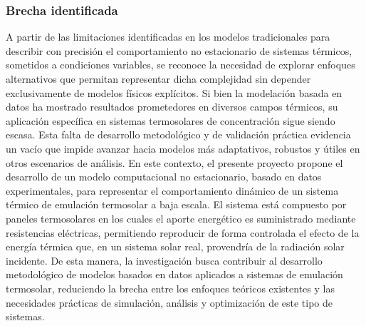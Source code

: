 \documentclass[11pt]{report}
\begin{document}
\subsubsection{Brecha identificada}

A partir de las limitaciones identificadas en los modelos tradicionales para describir con precisión el comportamiento no estacionario de sistemas térmicos, sometidos a condiciones variables, se reconoce la necesidad de explorar enfoques alternativos que permitan representar dicha complejidad sin depender exclusivamente de modelos físicos explícitos. Si bien la modelación basada en datos ha mostrado resultados prometedores en diversos campos térmicos, su aplicación específica en sistemas termosolares de concentración sigue siendo escasa. 
Esta falta de desarrollo metodológico y de validación práctica evidencia un vacío que impide avanzar hacia modelos más adaptativos, robustos y útiles en otros escenarios de análisis.
En este contexto, el presente proyecto propone el desarrollo de un modelo computacional no estacionario, basado en datos experimentales, para representar el comportamiento dinámico de un sistema térmico de emulación termosolar a baja escala. El sistema está compuesto por paneles termosolares en los cuales el aporte energético es suministrado mediante resistencias eléctricas, permitiendo reproducir de forma controlada el efecto de la energía térmica que, en un sistema solar real, provendría de la radiación solar incidente.
De esta manera, la investigación busca contribuir al desarrollo metodológico de modelos basados en datos aplicados a sistemas de emulación termosolar, reduciendo la brecha entre los enfoques teóricos existentes y las necesidades prácticas de simulación, análisis y optimización de este tipo de sistemas.
\end{document}
